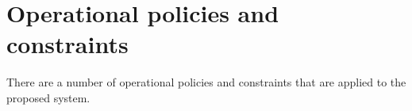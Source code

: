 

\section { Operational policies and constraints \label{Section::Operational Policies and constraints}}
There are a number of operational policies and constraints that are applied to the proposed system.
